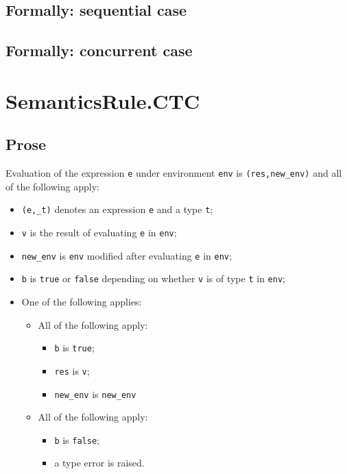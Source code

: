 \documentclass{book}
\begin{document}
\begin{emptyformal}
  \subsection{Formally: sequential case}

  \subsection{Formally: concurrent case}
\end{emptyformal}


\section{SemanticsRule.CTC \label{sec:SemanticsRule.CTC}}

  \subsection{Prose}
  Evaluation of the expression \texttt{e} under environment \texttt{env} is
  \texttt{(res,new\_env)} and all of the following apply:
  \begin{itemize}
  \item \texttt{(e,\_t)} denotes an expression \texttt{e} and a type \texttt{t};
  \item \texttt{v} is the result of evaluating \texttt{e} in \texttt{env};
  \item \texttt{new\_env} is \texttt{env} modified after evaluating \texttt{e} in \texttt{env};
  \item \texttt{b} is \texttt{true} or \texttt{false} depending on whether \texttt{v} is of type \texttt{t} in \texttt{env};
  \item One of the following applies:
        \begin{itemize}
        \item All of the following apply:
              \begin{itemize}
              \item \texttt{b} is \texttt{true};
              \item \texttt{res} is \texttt{v};
              \item \texttt{new\_env} is \texttt{new\_env}
              \end{itemize}
        \item All of the following apply:
              \begin{itemize}
              \item \texttt{b} is \texttt{false};
              \item a type error is raised.
              \end{itemize}
        \end{itemize}
  \end{itemize}
\end{document}
